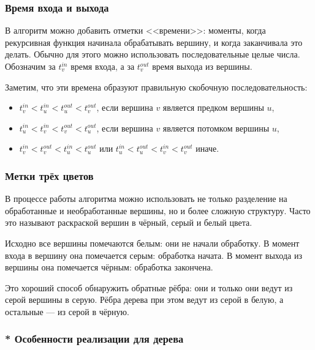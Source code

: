 \documentclass[a4paper,12pt]{article}
\begin{document}
      \subsubsection{Время входа и выхода}

      В алгоритм можно добавить отметки <<времени>>: моменты, когда
      рекурсивная функция начинала обрабатывать вершину, и когда
      заканчивала это делать. Обычно для этого можно использовать
      последовательные целые числа.
      Обозначим за $t^{in}_v$ время входа, а за
      $t^{out}_v$ время выхода из вершины.

      Заметим, что эти времена образуют правильную скобочную
      последовательность:
      \begin{itemize}
        \item $t^{in}_v < t^{in}_u < t^{out}_u < t^{out}_v$, если вершина
          $v$ является предком вершины $u$,
        \item $t^{in}_u < t^{in}_v < t^{out}_v < t^{out}_u$, если вершина
          $v$ является потомком вершины $u$,
        \item $t^{in}_v < t^{out}_v < t^{in}_u < t^{out}_u$ или
          $t^{in}_u < t^{out}_u < t^{in}_v < t^{out}_v$ иначе.
      \end{itemize}

      \subsubsection{Метки трёх цветов}

      В процессе работы алгоритма можно использовать не только разделение
      на обработанные и необработанные вершины, но и более сложную
      структуру. Часто это называют раскраской вершин в чёрный, серый и
      белый цвета.

      Исходно все вершины помечаются белым: они не начали обработку.
      В момент входа в вершину она помечается серым: обработка начата.
      В момент выхода из вершины она помечается чёрным: обработка
      закончена.

      Это хороший способ обнаружить обратные рёбра: они и только они
      ведут из серой вершины в серую. Рёбра дерева при этом ведут из
      серой в белую, а остальные --- из серой в чёрную.

      \subsubsection{* Особенности реализации для дерева}
\end{document}
